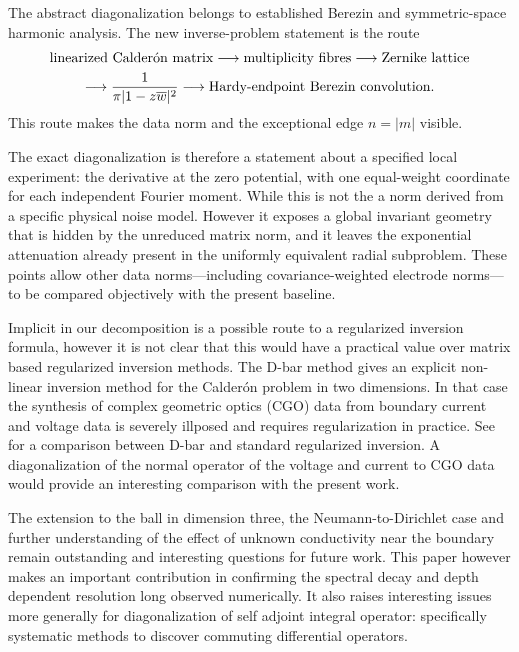 \IfFileExists{iopjournal.cls}{\documentclass{iopjournal}}{\documentclass{iopjournal-draft}}
\theoremstyle{definition}
\theoremstyle{remark}
\numberwithin{equation}{section}
\begin{document}
The abstract diagonalization belongs to established Berezin and symmetric-space harmonic analysis.  The new inverse-problem statement is the route
\begin{equation*}
\begin{gathered}
 \hbox{linearized Calder\'on matrix}
 \longrightarrow \hbox{multiplicity fibres}
 \longrightarrow \hbox{Zernike lattice}\\
 \longrightarrow \frac1{\pi|1-z\overline w|^2}
 \longrightarrow \hbox{Hardy-endpoint Berezin convolution}.
\end{gathered}
\end{equation*}
This route makes the data norm and the exceptional edge $n=|m|$ visible.%


The exact diagonalization is therefore a statement about a specified local experiment: the derivative at the zero potential, with one equal-weight coordinate for each independent Fourier moment.  
While this is not the a norm derived from a specific physical noise model. However it exposes a global invariant geometry that is hidden by the unreduced matrix norm, and it leaves the exponential attenuation already present in the uniformly equivalent radial subproblem.  These points allow other data norms---including covariance-weighted electrode norms---to be compared objectively with the present baseline.

Implicit in our decomposition is a possible route to a regularized inversion formula, however it is not clear that this would have a practical value over matrix based regularized inversion methods. The D-bar method gives an explicit non-linear inversion method for the Calder\'on problem in two dimensions. In that case the  synthesis of complex geometric optics (CGO) data from boundary current and voltage data is severely illposed and requires regularization in practice.  See \cite{hamilton2019comparing} for a comparison between D-bar and standard regularized inversion. A diagonalization of the normal operator of the voltage and current to CGO data would provide an interesting comparison with the present work. 

The extension to the ball in dimension three, the Neumann-to-Dirichlet case and  further understanding of the effect of unknown conductivity near the boundary remain outstanding and interesting questions for future work.  This paper however makes an important contribution in confirming the spectral decay and depth dependent resolution long observed numerically.  It also raises interesting issues more generally for diagonalization of self adjoint integral operator: specifically systematic methods to discover commuting differential operators.
\end{document}

